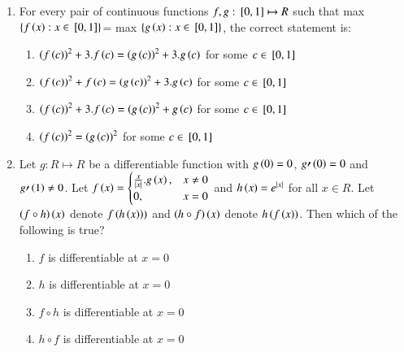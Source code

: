\documentclass[journal,12pt,twocolumn]{IEEEtran}
\theoremstyle{remark}
\begin{document}
\begin{enumerate}
    \item 
    For every pair of continuous functions $f, g: {}\left[0, 1\right]\mapsto R$ such that max $\left\{f\left(x\right): x\in {}\left[0, 1\right]\right\}$= max $\left\{g\left(x\right): x\in {}\left[0, 1\right]\right\}$, the correct statement is:
   
    \hfill 
    {}
    
    \begin{enumerate}[label=(\alph*)]
        
        \item ${\left(f\left(c\right)\right)}^2+3.f\left(c\right)={\left(g\left(c\right)\right)}^2+3.g\left(c\right)$ for some $c\in {}\left[0,1\right]$
        \item ${\left(f\left(c\right)\right)}^2+f\left(c\right)={\left(g\left(c\right)\right)}^2+3.g\left(c\right)$ for some $c\in {}\left[0,1\right]$
        \item ${\left(f\left(c\right)\right)}^2+3.f\left(c\right)={\left(g\left(c\right)\right)}^2+g\left(c\right)$ for some $c\in {}\left[0,1\right]$
        \item ${\left(f\left(c\right)\right)}^2={\left(g\left(c\right)\right)}^2$ for some $c\in {}\left[0,1\right]$ 
    \end{enumerate}


    \item 
    Let $g: R\mapsto R$ be a differentiable function with $g\left(0\right)=0$, $g\prime\left(0\right)=0$ and $g\prime\left(1\right)\neq 0$. Let $f\left(x\right)=
        \begin{cases}
            \frac{x}{|x|}.g\left(x\right), & x\neq 0 \\
            0, & x=0
        \end{cases}$ 
        and $h\left(x\right)=e^{|x|}$ for all $x\in R$. Let $\left(f\circ h\right)\left(x\right)$ denote $f\left(h\left(x\right)\right))$ and $\left(h\circ f\right)\left(x\right)$ denote $h\left(f\left(x\right)\right)$. Then which of the following is true?
        
    \hfill 
    {}
    
    \begin{enumerate}[label=(\alph*)]
        
        \item $f$ is differentiable at $x=0$ 
        \item $h$ is differentiable at $x=0$ 
        \item $f\circ h$ is differentiable at $x=0$ 
        \item $h\circ f$ is differentiable at $x=0$  
    \end{enumerate}



\end{enumerate}
\end{document}
